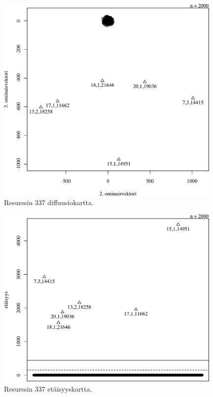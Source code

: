 \begin{figure}[p]
\centering
\includegraphics[width=11cm]{pics/diffuusiokuvat/service_337.pdf}
\caption{Resurssin 337 diffuusiokartta.}
\label{diffusio_337}
\end{figure}

\begin{figure}[p]
\centering
\includegraphics[width=11cm]{pics/tiheyskuvat/service_337.pdf}
\caption{Resurssin 337 etäisyyskartta.}
\label{service_337}
\end{figure}

